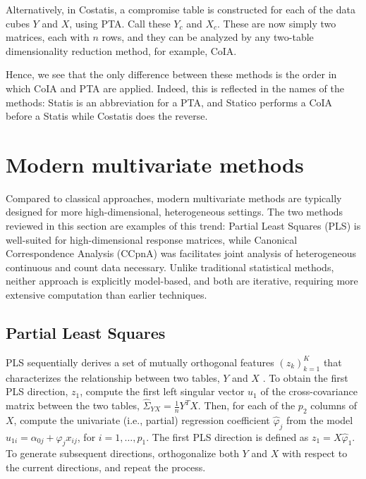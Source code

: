 \documentclass[utf8]{frontiersFPHY} %
\begin{document}
Alternatively, in Costatis, a compromise table is constructed for each of the
data cubes $Y$ and $X$, using PTA. Call these $Y_{c}$ and $X_{c}$. These are now
simply two matrices, each with $n$ rows, and they can be analyzed by any
two-table dimensionality reduction method, for example, CoIA.

Hence, we see that the only difference between these methods is the order in
which CoIA and PTA are applied. Indeed, this is reflected in the names of the
methods: Statis is an abbreviation for a PTA, and Statico performs a CoIA before
a Statis while Costatis does the reverse.

\section{Modern multivariate methods}

Compared to classical approaches, modern multivariate methods are typically
designed for more high-dimensional, heterogeneous settings. The two methods
reviewed in this section are examples of this trend: Partial Least Squares (PLS)
is well-suited for high-dimensional response matrices, while Canonical
Correspondence Analysis (CCpnA) was facilitates joint analysis of heterogeneous
continuous and count data necessary. Unlike traditional statistical methods,
neither approach is explicitly model-based, and both are iterative, requiring
more extensive computation than earlier techniques.

\subsection{Partial Least Squares}
\label{subsec:PLS}

PLS sequentially derives a set of mutually orthogonal features
$\left(z_{k}\right)_{k = 1}^{K}$ that characterizes the relationship between two
tables, $Y$ and $X$ \citep{wold1985partial}. To obtain the first PLS direction,
$z_{1}$, compute the first left singular vector $u_{1}$ of the cross-covariance
matrix between the two tables, $\hat{\Sigma}_{YX} = \frac{1}{n}Y^{T}X$. Then,
for each of the $p_{2}$ columns of $X$, compute the univariate (i.e., partial)
regression coefficient $\hat{\varphi}_{j}$ from the model $u_{1i} = \alpha_{0j}
+ \varphi_{j}x_{ij}$, for $i = 1, \dots, p_{1}$. The first PLS direction is
defined as $z_{1} = X\hat{\varphi}_{1}$. To generate subsequent directions,
orthogonalize both $Y$ and $X$ with respect to the current directions, and
repeat the process.
\end{document}
